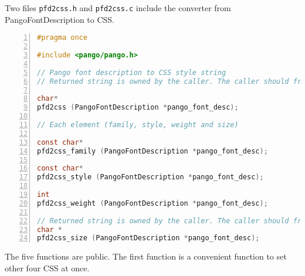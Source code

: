 Two files \passthrough{\lstinline!pfd2css.h!} and
\passthrough{\lstinline!pfd2css.c!} include the converter from
PangoFontDescription to CSS.

\begin{lstlisting}[language=C, numbers=left]
#pragma once

#include <pango/pango.h>

// Pango font description to CSS style string
// Returned string is owned by the caller. The caller should free it when it becomes useless.

char*
pfd2css (PangoFontDescription *pango_font_desc);

// Each element (family, style, weight and size)

const char*
pfd2css_family (PangoFontDescription *pango_font_desc);

const char*
pfd2css_style (PangoFontDescription *pango_font_desc);

int
pfd2css_weight (PangoFontDescription *pango_font_desc);

// Returned string is owned by the caller. The caller should free it when it becomes useless.
char *
pfd2css_size (PangoFontDescription *pango_font_desc);
\end{lstlisting}

The five functions are public. The first function is a convenient
function to set other four CSS at once.

